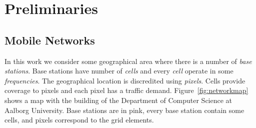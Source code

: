\section{Preliminaries}

\subsection{Mobile Networks}


In this work we consider some geographical area where there is a
number of \emph{base stations}. Base stations have number of
\emph{cells} and every \emph{cell} operate in some \emph{frequencies}.
The geographical location is discredited using \emph{pixels}. Cells
provide coverage to pixels and each pixel has a traffic demand.
Figure~\ref{fig:networkmap} shows a map with the building of the
Department of Computer Science at Aalborg University. Base stations
are in pink, every base station contain some cells, and pixels
correspond to the grid elements.


